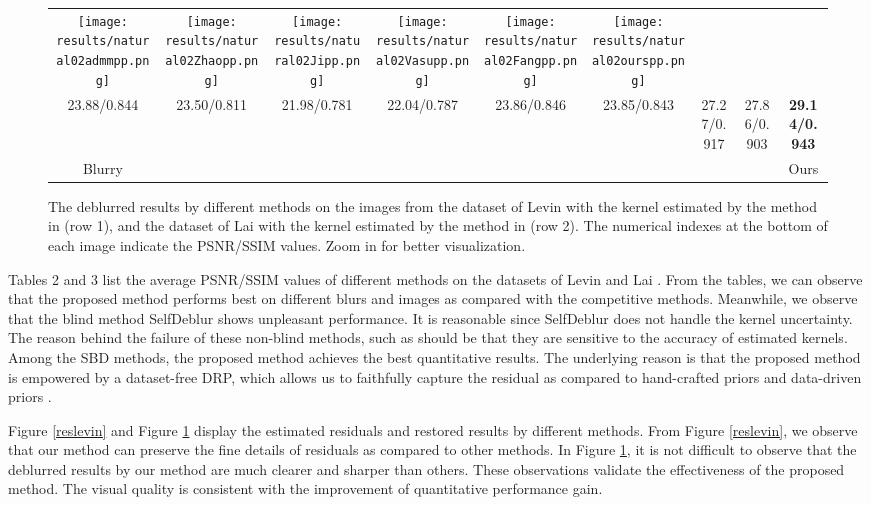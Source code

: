\documentclass[10pt,twocolumn,letterpaper]{article}
\begin{document}
\begin{figure}[!t]
\begin{tabular}{ccccccccc}
			\texttt{[image: results/natural02admmpp.png]}&
			\texttt{[image: results/natural02Zhaopp.png]}&
			\texttt{[image: results/natural02Jipp.png]}&
			\texttt{[image: results/natural02Vasupp.png]}&
			\texttt{[image: results/natural02Fangpp.png]}&
			\texttt{[image: results/natural02ourspp.png]}\\
			23.88/0.844&23.50/0.811&21.98/0.781&22.04/0.787&23.86/0.846&23.85/0.843&27.27/0.917&27.86/0.903&\textbf{29.14/0.943}\\
			Blurry&\cite{ren2020neural}&\cite{krishnan2009fast}&\cite{ren2015fast}&\cite{Zhao2013TotalVS}&\cite{ji2011robust}&\cite{vasu2018non}&\cite{Fang_2022_CVPR}&Ours
		\end{tabular}
		\caption{The deblurred results by different methods on the images from the dataset of Levin \etal\cite{levin2009understanding} with the kernel estimated by the method in \cite{cho2009fast} (row 1), and the dataset of Lai \etal \cite{lai2016comparative} with the kernel estimated by the method in \cite{perrone2014total} (row 2). The numerical indexes at the bottom of each image indicate the PSNR/SSIM values. Zoom in for better visualization.}
		\label{Levin}
	\end{figure}
	
	Tables 2 and 3 list the average PSNR/SSIM values of different methods on the datasets of Levin \etal\cite{levin2009understanding} and Lai \etal \cite{lai2016comparative}. From the tables, we can observe that the proposed method performs best on different blurs and images as compared with the competitive methods. Meanwhile, we observe that the blind method SelfDeblur \cite{ren2020neural} shows unpleasant performance. It is reasonable since SelfDeblur \cite{ren2020neural} does not handle the kernel uncertainty. The reason behind the failure of these non-blind methods, such as \cite{krishnan2009fast, ren2015fast, eboli2020end2end}  should be that they are sensitive to the accuracy of estimated kernels. Among the SBD methods, the proposed method achieves the best quantitative results. The underlying reason is that the proposed method is empowered by a dataset-free DRP, which allows us to faithfully capture the residual as compared to hand-crafted priors \cite{Zhao2013TotalVS, ji2011robust} and data-driven priors \cite{vasu2018non, Fang_2022_CVPR}. 
	
	Figure \ref{reslevin} and Figure \ref{Levin} display the estimated residuals and restored results by different methods.  From Figure \ref{reslevin}, we observe that our method can preserve the fine details of residuals as compared to other methods. In Figure \ref{Levin},  it is not difficult to observe that the deblurred results by our method are much clearer and sharper than others. These observations validate the effectiveness of the proposed method. The visual quality is consistent with the improvement of quantitative performance gain.
	
\end{document}
